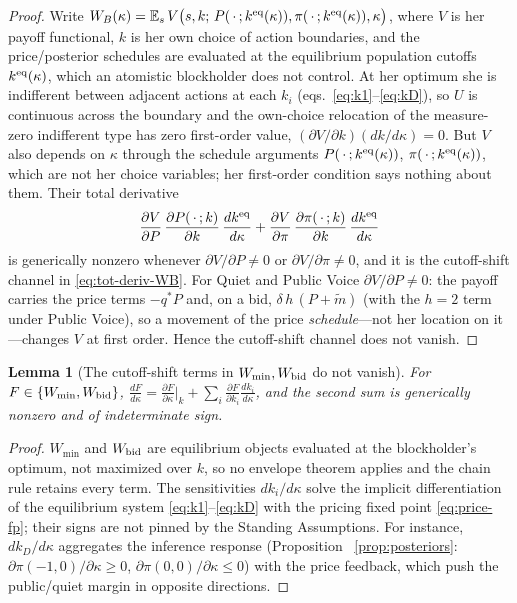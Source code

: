 \documentclass[11pt]{article}
\newtheorem{lemma}{Lemma}
\newcommand{\E}{\mathbb{E}}
\newcommand{\1}{\mathbf{1}}
\begin{document}
\begin{proof}
Write $W_B(\kappa)=\E_s\,V\big(s,k;\,P(\,\cdot\,;k^{\textup{eq}}(\kappa)),
\pi(\,\cdot\,;k^{\textup{eq}}(\kappa)),\kappa\big)$, where $V$ is her payoff
functional, $k$ is her own choice of action boundaries, and the price/posterior
schedules are evaluated at the equilibrium population cutoffs
$k^{\textup{eq}}(\kappa)$, which an atomistic blockholder does not control. At her
optimum she is indifferent between adjacent actions at each $k_i$
(eqs.~\eqref{eq:k1}--\eqref{eq:kD}), so $U$ is continuous across the boundary and
the own-choice relocation of the measure-zero indifferent type has zero
first-order value, $(\partial V/\partial k)(dk/d\kappa)=0$. But $V$ also depends
on $\kappa$ through the schedule arguments $P(\,\cdot\,;k^{\textup{eq}}(\kappa))$,
$\pi(\,\cdot\,;k^{\textup{eq}}(\kappa))$, which are not her choice variables; her
first-order condition says nothing about them. Their total derivative
\begin{equation}
\frac{\partial V}{\partial P}\,\frac{\partial P(\,\cdot\,;k)}{\partial k}\,
   \frac{dk^{\textup{eq}}}{d\kappa}
+\frac{\partial V}{\partial\pi}\,\frac{\partial\pi(\,\cdot\,;k)}{\partial k}\,
   \frac{dk^{\textup{eq}}}{d\kappa}
\label{eq:schedule-channel}
\end{equation}
is generically nonzero whenever $\partial V/\partial P\neq0$ or
$\partial V/\partial\pi\neq0$, and it is the cutoff-shift channel in
\eqref{eq:tot-deriv-WB}. For Quiet and Public Voice $\partial V/\partial P\neq0$:
the payoff carries the price terms $-q^{\ast}P$ and, on a bid, $\delta\,h\,(P+
\tilde m)$ (with the $h{=}2$ term under Public Voice), so a movement of the price
\emph{schedule}---not her location on it---changes $V$ at first order. Hence the
cutoff-shift channel does not vanish.
\end{proof}

\begin{lemma}[The cutoff-shift terms in $W_{\min},W_{\textup{bid}}$ do not vanish]
\label{lem:no-env-other}
For $F\in\{W_{\min},W_{\textup{bid}}\}$,
$\frac{dF}{d\kappa}=\frac{\partial F}{\partial\kappa}\big|_{k}
 +\sum_{i}\frac{\partial F}{\partial k_i}\frac{dk_i}{d\kappa}$, and the second
sum is generically nonzero and of indeterminate sign.
\end{lemma}

\begin{proof}
$W_{\min}$ and $W_{\textup{bid}}$ are equilibrium objects evaluated at the
blockholder's optimum, not maximized over $k$, so no envelope theorem applies and
the chain rule retains every term. The sensitivities $dk_i/d\kappa$ solve the
implicit differentiation of the equilibrium system
\eqref{eq:k1}--\eqref{eq:kD} with the pricing fixed point \eqref{eq:price-fp};
their signs are not pinned by the Standing Assumptions. For instance,
$dk_D/d\kappa$ aggregates the inference response (Proposition~%
\ref{prop:posteriors}: $\partial\pi(-1,0)/\partial\kappa\ge0$,
$\partial\pi(0,0)/\partial\kappa\le0$) with the price feedback, which push the
public/quiet margin in opposite directions.
\end{proof}
\end{document}
